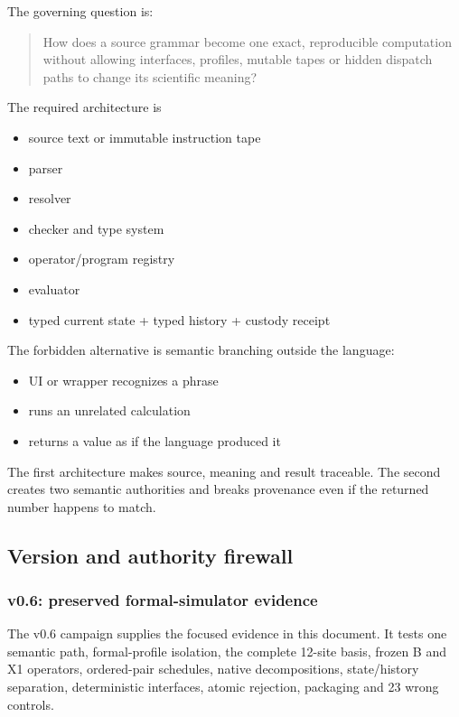 The governing question is:

\begin{quote}
How does a source grammar become one exact, reproducible computation
without allowing interfaces, profiles, mutable tapes or hidden dispatch
paths to change its scientific meaning?
\end{quote}

The required architecture is

\begin{itemize}
\tightlist
\item
  source text or immutable instruction tape
\item
  parser
\item
  resolver
\item
  checker and type system
\item
  operator/program registry
\item
  evaluator
\item
  typed current state + typed history + custody receipt
\end{itemize}

The forbidden alternative is semantic branching outside the language:

\begin{itemize}
\tightlist
\item
  UI or wrapper recognizes a phrase
\item
  runs an unrelated calculation
\item
  returns a value as if the language produced it
\end{itemize}

The first architecture makes source, meaning and result traceable. The
second creates two semantic authorities and breaks provenance even if
the returned number happens to match.

\subsection{Version and authority
firewall}\label{viii-ch02-version-and-authority-firewall}

\subsubsection{v0.6: preserved formal-simulator
evidence}\label{viii-ch02-v0.6-preserved-formal-simulator-evidence}

The v0.6 campaign supplies the focused evidence in this document. It
tests one semantic path, formal-profile isolation, the complete 12-site
basis, frozen B and X1 operators, ordered-pair schedules, native
decompositions, state/history separation, deterministic interfaces,
atomic rejection, packaging and 23 wrong controls.

